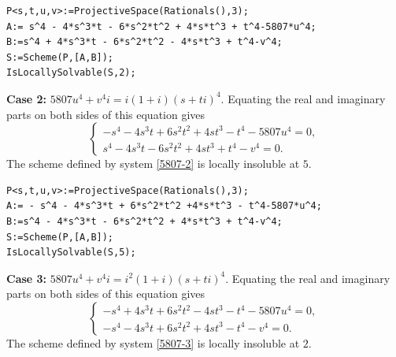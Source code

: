 \documentclass[a4paper,12pt,english,reqno]{amsart}
\begin{document}
\begin{lstlisting}
P<s,t,u,v>:=ProjectiveSpace(Rationals(),3);
A:= s^4 - 4*s^3*t - 6*s^2*t^2 + 4*s*t^3 + t^4-5807*u^4;
B:=s^4 + 4*s^3*t - 6*s^2*t^2 - 4*s*t^3 + t^4-v^4;
S:=Scheme(P,[A,B]);
IsLocallySolvable(S,2);
\end{lstlisting}

{\bf Case 2:} $5807u^4+v^4i=i(1+i)(s+ti)^4$. Equating the real and imaginary parts on both sides of this equation gives
\begin{equation}\label{5807-2}
\begin{cases}
-s^4 - 4s^3t + 6s^2t^2 + 4st^3 - t^4 - 5807u^4=0,\\
s^4 - 4s^3t - 6s^2t^2 + 4st^3 + t^4 - v^4=0.
\end{cases}
\end{equation}
The scheme defined by system \eqref{5807-2} is locally insoluble at $5$.

\begin{lstlisting}
P<s,t,u,v>:=ProjectiveSpace(Rationals(),3);
A:= - s^4 - 4*s^3*t + 6*s^2*t^2 +4*s*t^3 - t^4-5807*u^4;
B:=s^4 - 4*s^3*t - 6*s^2*t^2 + 4*s*t^3 + t^4-v^4;
S:=Scheme(P,[A,B]);
IsLocallySolvable(S,5);
\end{lstlisting}
{\bf Case 3:} $5807u^4+v^4i=i^2(1+i)(s+ti)^4$.  Equating the real and imaginary parts on both sides of this equation gives
\begin{equation}\label{5807-3}
\begin{cases}
-s^4 + 4s^3t + 6s^2t^2 - 4st^3 - t^4 - 5807u^4=0,\\
-s^4 - 4s^3t + 6s^2t^2 + 4st^3 - t^4 - v^4=0.
\end{cases}
\end{equation}
The scheme defined by system \eqref{5807-3} is locally insoluble at $2$.
\end{document}
